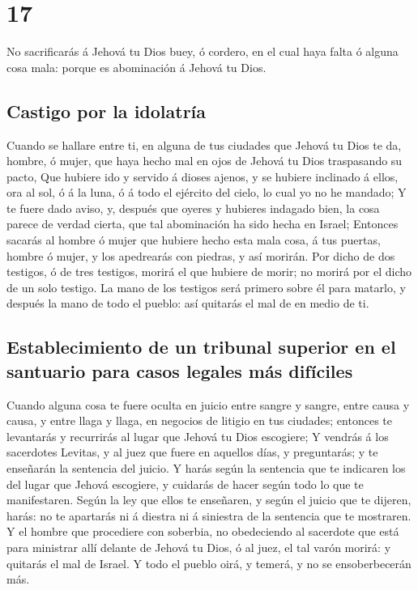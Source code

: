 \hypertarget{section-05-17}{%
\section{17}\label{section-05-17}}

 No sacrificarás á Jehová tu Dios buey, ó cordero, en el
cual haya falta ó alguna cosa mala: porque es abominación á Jehová tu
Dios.

\hypertarget{castigo-por-la-idolatruxeda}{%
\subsection{Castigo por la
idolatría}\label{castigo-por-la-idolatruxeda}}

 Cuando se hallare entre ti, en alguna de tus ciudades que
Jehová tu Dios te da, hombre, ó mujer, que haya hecho mal en ojos de
Jehová tu Dios traspasando su pacto,  Que hubiere ido y
servido á dioses ajenos, y se hubiere inclinado á ellos, ora al sol, ó á
la luna, ó á todo el ejército del cielo, lo cual yo no he mandado;
 Y te fuere dado aviso, y, después que oyeres y hubieres
indagado bien, la cosa parece de verdad cierta, que tal abominación ha
sido hecha en Israel;  Entonces sacarás al hombre ó mujer
que hubiere hecho esta mala cosa, á tus puertas, hombre ó mujer, y los
apedrearás con piedras, y así morirán.  Por dicho de dos
testigos, ó de tres testigos, morirá el que hubiere de morir; no morirá
por el dicho de un solo testigo.  La mano de los testigos
será primero sobre él para matarlo, y después la mano de todo el pueblo:
así quitarás el mal de en medio de ti.

\hypertarget{establecimiento-de-un-tribunal-superior-en-el-santuario-para-casos-legales-muxe1s-difuxedciles}{%
\subsection{Establecimiento de un tribunal superior en el santuario para
casos legales más
difíciles}\label{establecimiento-de-un-tribunal-superior-en-el-santuario-para-casos-legales-muxe1s-difuxedciles}}

 Cuando alguna cosa te fuere oculta en juicio entre sangre
y sangre, entre causa y causa, y entre llaga y llaga, en negocios de
litigio en tus ciudades; entonces te levantarás y recurrirás al lugar
que Jehová tu Dios escogiere;  Y vendrás á los sacerdotes
Levitas, y al juez que fuere en aquellos días, y preguntarás; y te
enseñarán la sentencia del juicio.  Y harás según la
sentencia que te indicaren los del lugar que Jehová escogiere, y
cuidarás de hacer según todo lo que te manifestaren. 
Según la ley que ellos te enseñaren, y según el juicio que te dijeren,
harás: no te apartarás ni á diestra ni á siniestra de la sentencia que
te mostraren.  Y el hombre que procediere con soberbia,
no obedeciendo al sacerdote que está para ministrar allí delante de
Jehová tu Dios, ó al juez, el tal varón morirá: y quitarás el mal de
Israel.  Y todo el pueblo oirá, y temerá, y no se
ensoberbecerán más.

